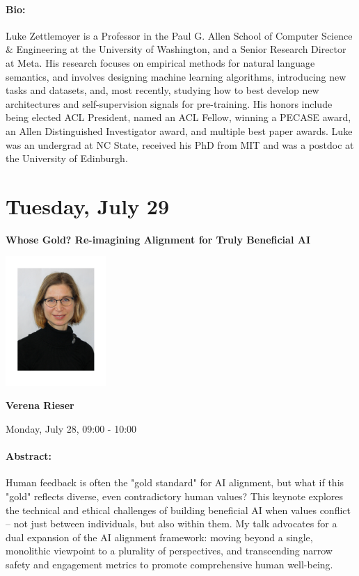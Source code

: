 \paragraph{Bio:}
Luke Zettlemoyer is a Professor in the Paul G. Allen School of Computer Science & Engineering at the University of Washington, and a Senior Research Director at Meta. His research focuses on empirical methods for natural language semantics, and involves designing machine learning algorithms, introducing new tasks and datasets, and, most recently, studying how to best develop new architectures and self-supervision signals for pre-training. His honors include being elected ACL President, named an ACL Fellow, winning a PECASE award, an Allen Distinguished Investigator award, and multiple best paper awards. Luke was an undergrad at NC State, received his PhD from MIT and was a postdoc at the University of Edinburgh.


\clearpage


\section{Tuesday, July 29}


\begin{center}
    {\Large \textbf{Whose Gold? Re-imagining Alignment for Truly Beneficial AI}}
    
    \includegraphics[width=1.5in]{Verena.pdf}
    
    {\large \textbf{Verena Rieser}}

    Monday, July 28, 09:00 - 10:00
\end{center}

\paragraph{Abstract:}
Human feedback is often the "gold standard" for AI alignment, but what if this "gold" reflects diverse, even contradictory human values? This keynote explores the technical and ethical challenges of building beneficial AI when values conflict -- not just between individuals, but also within them. My talk advocates for a dual expansion of the AI alignment framework: moving beyond a single, monolithic viewpoint to a plurality of perspectives, and transcending narrow safety and engagement metrics to promote comprehensive human well-being. 

